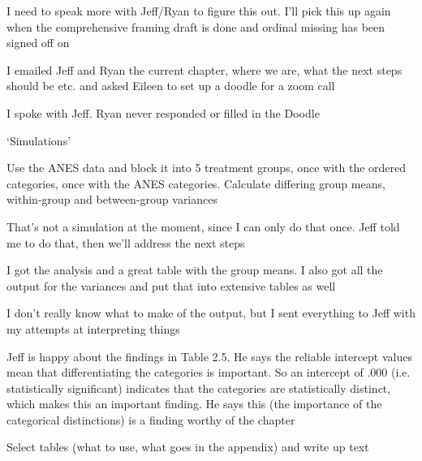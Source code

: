 \documentclass[12pt]{article}
\begin{document}
\begin{coi}
\begin{coi}
				\item I need to speak more with Jeff/Ryan to figure this out. I'll pick this up again when the comprehensive framing draft is done and ordinal missing has been signed off on
				\item I emailed Jeff and Ryan the current chapter, where we are, what the next steps should be etc. and asked Eileen to set up a doodle for a zoom call
				\item I spoke with Jeff. Ryan never responded or filled in the Doodle
			\end{coi}
		\item `Simulations'
			\begin{coi}
				\item Use the ANES data and block it into 5 treatment groups, once with the ordered categories, once with the ANES categories. Calculate differing group means, within-group and between-group variances
				\item That's not a simulation at the moment, since I can only do that once. Jeff told me to do that, then we'll address the next steps
				\item I got the analysis and a great table with the group means. I also got all the output for the variances and put that into extensive tables as well
				\item I don't really know what to make of the output, but I sent everything to Jeff with my attempts at interpreting things
				\item Jeff is happy about the findings in Table 2.5. He says the reliable intercept values mean that differentiating the categories is important. So an intercept of .000 (i.e. statistically significant) indicates that the categories are statistically distinct, which makes this an important finding. He says this (the importance of the categorical distinctions) is a finding worthy of the chapter
				\item Select tables (what to use, what goes in the appendix) and write up text
			\end{coi}
	\end{coi}
	
\end{document}
